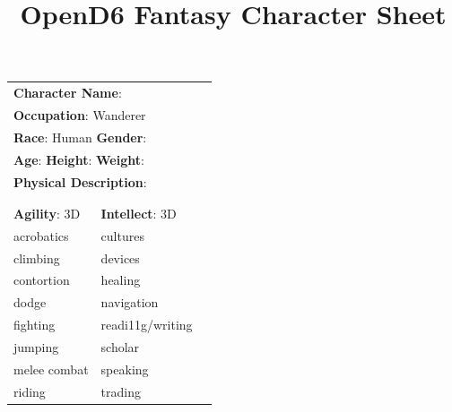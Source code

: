 \documentclass[10pt]{article}
\title{OpenD6 Fantasy Character Sheet}
\begin{document}
\pagestyle{fancy}
\fancyhf{}
\fancyfoot[R]{\thepage}
\renewcommand{\headrulewidth}{0pt}


\cleardoublepage
\begin{table}
\begin{tabular}{m{156pt} m{156pt} m{156pt}}
    \multicolumn{2}{l}{\textbf{Character Name}:  \hrulefill} \\
    \multicolumn{2}{l}{\textbf{Occupation}: Wanderer \hrulefill} \\
    \multicolumn{2}{l}{\textbf{Race}: Human \hrulefill \hspace{1em} \textbf{Gender}:  \hrulefill} \\
    \multicolumn{2}{l}{\textbf{Age}:  \hrulefill \hspace{1em} \textbf{Height}:  \hrulefill \hspace{1em}  \textbf{Weight}:  \hrulefill } \\
    \multicolumn{2}{l}{\textbf{Physical Description}:  \hrulefill } \\
    \multicolumn{2}{l}{ \hrulefill } \\
 & & \\
\textbf{Agility}: 3D \hrulefill      & \textbf{Intellect}: 3D \hrulefill  &                             \\

acrobatics           \hrulefill & cultures             \hrulefill & \\

climbing             \hrulefill & devices              \hrulefill & \\

contortion           \hrulefill & healing              \hrulefill & \\

dodge                \hrulefill & navigation           \hrulefill & \\

fighting             \hrulefill & readi11g/writing     \hrulefill & \\

jumping              \hrulefill & scholar              \hrulefill & \\

melee combat         \hrulefill & speaking             \hrulefill & \\

riding               \hrulefill & trading              \hrulefill & \\


\end{tabular}
\end{table}
\end{document}

